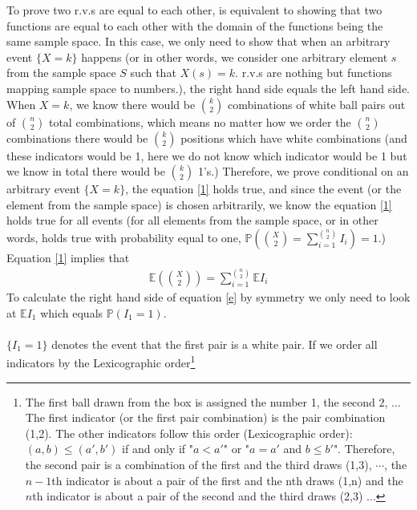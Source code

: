 \begin{exercise} [BH.4.48]
\begin{solution}
\begin{enumerate}
    To prove two r.v.s are equal to each other, is equivalent to showing that two functions are equal to each other with the domain of the functions being the same sample space. In this case, we only need to show that when an arbitrary event $\{X=k\}$ happens (or in other words, we consider one arbitrary element $s$ from the sample space $S$ such that $X(s)=k$. r.v.s are nothing but functions mapping sample space to numbers.), the right hand side equals the left hand side.   When $X=k$, we know there would be $\binom{k}{2}$ combinations of white ball pairs out of $\binom{n}{2}$ total combinations,  which means no matter how  we order the $\binom{n}{2}$ combinations there would be $\binom{k}{2}$ positions which have white combinations (and these indicators would be 1, here we do not know which indicator would be 1 but we know in total there would be $\binom{k}{2}$ 1's.) Therefore, we prove conditional on an arbitrary event $\{X=k\}$, the equation \eqref{1} holds true, and since the event (or the element from the sample space) is chosen arbitrarily, we know  the equation \eqref{1} holds true for all events (for all elements from the sample space, or in other words, holds true with probability equal to one, $\mathbb{P}\left(\binom{X}{2}= \sum_{i=1}^{\binom{n}{2}} I_i \right)=1$.)\\
    Equation \eqref{1} implies that 
    \begin{align}
        \mathbb{E}\left(\binom{X}{2}\right) = \sum_{i=1}^{\binom{n}{2}}\mathbb{E} I_i \label{e}
    \end{align}
    To calculate the right hand side of equation \eqref{e} by symmetry we only need to look at $\mathbb{E} I_1$ which equals $\mathbb{P}(I_1=1)$. \\~\\
    $\{I_1=1\}$  denotes the event that the first pair is a white pair. If we order all indicators by the Lexicographic order\footnote{The first ball drawn from the box is assigned the number 1, the second 2, ...  
    The first indicator (or the first pair combination) is the pair combination (1,2). The other 
    indicators follow this order (Lexicographic order): $(a,b)\leq (a',b')$ if and only if "$a<a'$" or "$a=a'$ and $b\leq b'$". Therefore, the second pair is a combination of the first and the third draws (1,3), $\cdots$, the $n-1$th indicator is about a pair of the first and the nth draws (1,n) and the $n$th indicator is about a pair of the second and the third draws (2,3) ...
    
}
\end{enumerate}
\end{solution}
\end{exercise}
